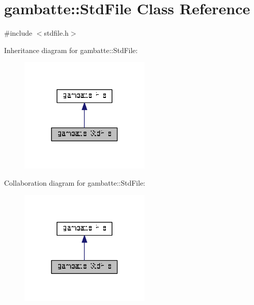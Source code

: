 \hypertarget{classgambatte_1_1StdFile}{}\section{gambatte\+:\+:Std\+File Class Reference}
\label{classgambatte_1_1StdFile}


{\ttfamily \#include $<$stdfile.\+h$>$}



Inheritance diagram for gambatte\+:\+:Std\+File\+:\nopagebreak
\begin{figure}[H]
\begin{center}
\leavevmode
\includegraphics[width=177pt]{classgambatte_1_1StdFile__inherit__graph}
\end{center}
\end{figure}


Collaboration diagram for gambatte\+:\+:Std\+File\+:\nopagebreak
\begin{figure}[H]
\begin{center}
\leavevmode
\includegraphics[width=177pt]{classgambatte_1_1StdFile__coll__graph}
\end{center}
\end{figure}
